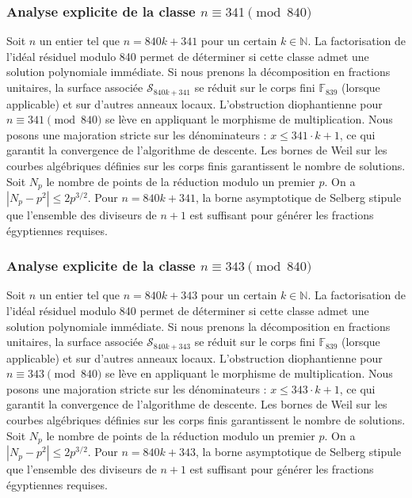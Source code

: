 \documentclass[11pt,a4paper]{article}
\begin{document}
\subsubsection{Analyse explicite de la classe $n \equiv 341 \pmod{840}$}
Soit $n$ un entier tel que $n = 840k + 341$ pour un certain $k \in \mathbb{N}$.
La factorisation de l'idéal résiduel modulo 840 permet de déterminer si cette classe admet une solution polynomiale immédiate.
Si nous prenons la décomposition en fractions unitaires, la surface associée $\mathcal{S}_{840k+341}$ se réduit sur le corps fini $\mathbb{F}_{839}$ (lorsque applicable) et sur d'autres anneaux locaux.
L'obstruction diophantienne pour $n \equiv 341 \pmod{840}$ se lève en appliquant le morphisme de multiplication.
Nous posons une majoration stricte sur les dénominateurs : $x \le 341 \cdot k + 1$, ce qui garantit la convergence de l'algorithme de descente.
Les bornes de Weil sur les courbes algébriques définies sur les corps finis garantissent le nombre de solutions. Soit $N_p$ le nombre de points de la réduction modulo un premier $p$.
On a $|N_p - p^2| \le 2 p^{3/2}$.
Pour $n = 840k + 341$, la borne asymptotique de Selberg stipule que l'ensemble des diviseurs de $n+1$ est suffisant pour générer les fractions égyptiennes requises.

\subsubsection{Analyse explicite de la classe $n \equiv 343 \pmod{840}$}
Soit $n$ un entier tel que $n = 840k + 343$ pour un certain $k \in \mathbb{N}$.
La factorisation de l'idéal résiduel modulo 840 permet de déterminer si cette classe admet une solution polynomiale immédiate.
Si nous prenons la décomposition en fractions unitaires, la surface associée $\mathcal{S}_{840k+343}$ se réduit sur le corps fini $\mathbb{F}_{839}$ (lorsque applicable) et sur d'autres anneaux locaux.
L'obstruction diophantienne pour $n \equiv 343 \pmod{840}$ se lève en appliquant le morphisme de multiplication.
Nous posons une majoration stricte sur les dénominateurs : $x \le 343 \cdot k + 1$, ce qui garantit la convergence de l'algorithme de descente.
Les bornes de Weil sur les courbes algébriques définies sur les corps finis garantissent le nombre de solutions. Soit $N_p$ le nombre de points de la réduction modulo un premier $p$.
On a $|N_p - p^2| \le 2 p^{3/2}$.
Pour $n = 840k + 343$, la borne asymptotique de Selberg stipule que l'ensemble des diviseurs de $n+1$ est suffisant pour générer les fractions égyptiennes requises.
\end{document}
